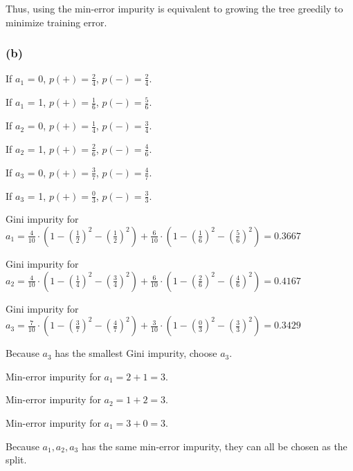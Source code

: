 \documentclass[12pt]{article}
\begin{document}
{Thus, using the min-error impurity is equivalent to growing the tree greedily to minimize training error.

\subsubsection*{(b)}
If $a_1$ = 0, $p(+)=\frac{2}{4}$, $p(-)=\frac{2}{4}$.

If $a_1$ = 1, $p(+)=\frac{1}{6}$, $p(-)=\frac{5}{6}$.

If $a_2$ = 0, $p(+)=\frac{1}{4}$, $p(-)=\frac{3}{4}$.

If $a_2$ = 1, $p(+)=\frac{2}{6}$, $p(-)=\frac{4}{6}$.

If $a_3$ = 0, $p(+)=\frac{3}{7}$, $p(-)=\frac{4}{7}$.

If $a_3$ = 1, $p(+)=\frac{0}{3}$, $p(-)=\frac{3}{3}$.

\medskip
Gini impurity for $a_1 = \frac{4}{10}\cdot(1-(\frac{1}{2})^2-(\frac{1}{2})^2)+\frac{6}{10}\cdot(1-(\frac{1}{6})^2-(\frac{5}{6})^2)=0.3667$

\medskip
Gini impurity for $a_2 = \frac{4}{10}\cdot(1-(\frac{1}{4})^2-(\frac{3}{4})^2)+\frac{6}{10}\cdot(1-(\frac{2}{6})^2-(\frac{4}{6})^2)=0.4167$

\medskip
Gini impurity for $a_3 = \frac{7}{10}\cdot(1-(\frac{3}{7})^2-(\frac{4}{7})^2)+\frac{3}{10}\cdot(1-(\frac{0}{3})^2-(\frac{3}{3})^2)=0.3429$

Because $a_3$ has the smallest Gini impurity, choose $a_3$.

\medskip
Min-error impurity for $a_1 = 2 + 1 = 3$.

\medskip
Min-error impurity for $a_2 = 1 + 2 = 3$.

\medskip
Min-error impurity for $a_1 = 3 + 0 = 3$.

Because $a_1,a_2,a_3$ has the same min-error impurity, they can all be chosen as the split.

%
%
%
%

}
\end{document}
